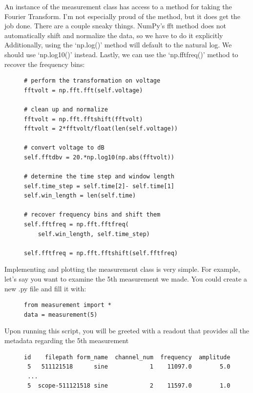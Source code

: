 \documentclass{article}
\begin{document}
An instance of the measurement class has access to a method for taking the
Fourier Transform. I'm not especially proud of the method, but it does get the
job done. There are a couple sneaky things. NumPy's fft method does not
automatically shift and normalize the data, so we have to do it explicitly
Additionally, using the `np.log()' method will default to the natural log. We
should use `np.log10()' instead. Lastly, we can use the `np.fftfreq()' method
to recover the frequency bins:

\begin{figure}[H]
\centering
\begin{minipage}{1\textwidth}
\begin{tcolorbox}
\begin{verbatim}
# perform the transformation on voltage
fftvolt = np.fft.fft(self.voltage)

# clean up and normalize
fftvolt = np.fft.fftshift(fftvolt)
fftvolt = 2*fftvolt/float(len(self.voltage))

# convert voltage to dB
self.fftdbv = 20.*np.log10(np.abs(fftvolt))

# determine the time step and window length
self.time_step = self.time[2]- self.time[1]
self.win_length = len(self.time)

# recover frequency bins and shift them
self.fftfreq = np.fft.fftfreq(
    self.win_length, self.time_step)

self.fftfreq = np.fft.fftshift(self.fftfreq)
\end{verbatim}
\end{tcolorbox}
\end{minipage}
\end{figure}

Implementing and plotting the measurement class is very simple. For example,
let's say you want to examine the 5th measurement we made. You could create a
new .py file and fill it with:
\begin{figure}[H]
\centering
\begin{minipage}{1\textwidth}
\begin{tcolorbox}
\begin{verbatim}
from measurement import *
data = measurement(5)
\end{verbatim}
\end{tcolorbox}
\end{minipage}
\end{figure}

Upon running this script, you will be greeted with a readout that provides all
the metadata regarding the 5th measurement
\begin{figure}[H]
\centering
\begin{minipage}{1\textwidth}
\begin{tcolorbox}
\begin{verbatim}
id    filepath form_name  channel_num  frequency  amplitude
 5   511121518      sine            1    11097.0        5.0
 ...
 5  scope-511121518 sine            2    11597.0        1.0
\end{verbatim}
\end{tcolorbox}
\end{minipage}
\end{figure}
\end{document}
